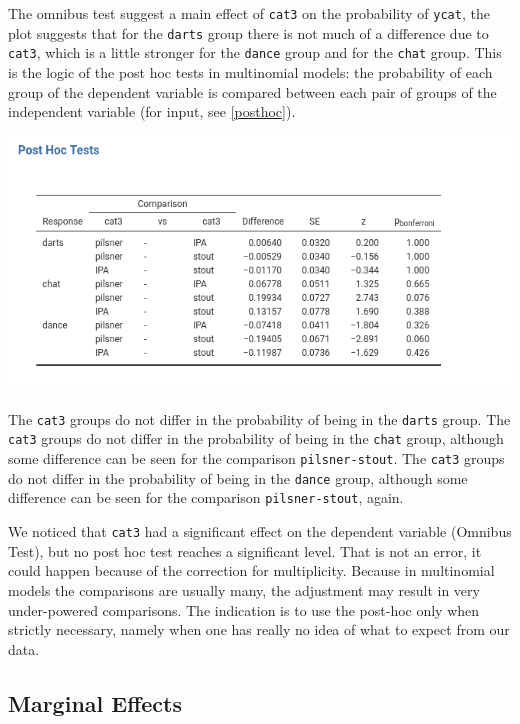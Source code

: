 \documentclass[
]{book}
\begin{document}
The omnibus test suggest a main effect of \texttt{cat3} on the probability of \texttt{ycat}, the plot suggests that for the \texttt{darts} group there is not much of a difference due to \texttt{cat3}, which is a little stronger for the \texttt{dance} group and for the \texttt{chat} group. This is the logic of the post hoc tests in multinomial models: the probability of each group of the dependent variable is compared between each pair of groups of the independent variable (for input, see \ref{posthoc}).

\includegraphics[width=9.15in]{bookletpics/3_multi_output6}

The \texttt{cat3} groups do not differ in the probability of being in the \texttt{darts} group. The \texttt{cat3} groups do not differ in the probability of being in the \texttt{chat} group, although some difference can be seen for the comparison \texttt{pilsner-stout}. The \texttt{cat3} groups do not differ in the probability of being in the \texttt{dance} group, although some difference can be seen for the comparison \texttt{pilsner-stout}, again.

We noticed that \texttt{cat3} had a significant effect on the dependent variable ({Omnibus Test}), but no post hoc test reaches a significant level. That is not an error, it could happen because of the correction for multiplicity. Because in multinomial models the comparisons are usually many, the adjustment may result in very under-powered comparisons. The indication is to use the post-hoc only when strictly necessary, namely when one has really no idea of what to expect from our data.

\hypertarget{marginal-effects}{%
\subsection{Marginal Effects}\label{marginal-effects}}
\end{document}

